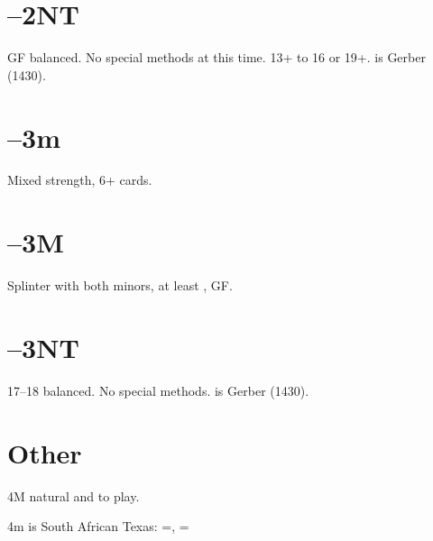 \documentclass[tom-jenni]{subfiles}
\begin{document}
\section[1D--2NT]{--2NT}

GF balanced. No special methods at this time. 13+ to 16 or 19+.   is Gerber (1430).

\section[1D--3m]{--3m}

Mixed strength, 6+ cards.

\section[1D--3M]{--3M}

Splinter with both minors, at least , GF.

\section[1D--3NT]{--3NT}

17--18 balanced. No special methods.  is Gerber (1430).

\section{Other}

4M natural and to play.

4m is South African Texas:  =\hhh, =\sss 
\end{document}
